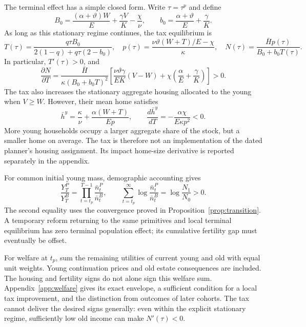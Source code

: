 \documentclass[11pt]{article}
\newcommand{\HH}{\bar H}
\newcommand{\tht}{\vartheta}
\begin{document}
The terminal effect has a simple closed form. Write $\tau=\tau^p$ and define
\[
 B_0=\frac{(\alpha+\tht)W}{E}+\frac{\gamma V}{K}-\frac\chi\nu,
 \qquad b_0=\frac{\alpha+\tht}{E}+\frac\gamma K.
\]
As long as this stationary regime continues, the tax equilibrium is
\begin{equation}
 T(\tau)=\frac{q\tau B_0}{2(1-q)+q\tau(2-b_0)},\quad
 p(\tau)=\frac{\nu\tht(W+T)/E-\chi}{\kappa},\quad
 N(\tau)=\frac{\HH p(\tau)}{B_0+b_0T(\tau)}.\label{eq:taxstationary}
\end{equation}
In particular, $T'(\tau)>0$, and
\begin{equation}
 \frac{\partial N}{\partial T}
 =\frac{\HH}{\kappa(B_0+b_0T)^2}
 \left[\frac{\nu\tht\gamma}{EK}(V-W)+\chi\left(\frac\alpha E+\frac\gamma K\right)\right]>0.\label{eq:Ntau}
\end{equation}
The tax also increases the stationary aggregate housing allocated to the young when $V\ge W$. However, their mean home satisfies
\begin{equation}
 \bar h^y=\frac\kappa\nu+\frac{\alpha(W+T)}{Ep},\qquad
 \frac{d\bar h^y}{dT}=-\frac{\alpha\chi}{E\kappa p^2}<0.\label{eq:peryoungfall}
\end{equation}
More young households occupy a larger aggregate share of the stock, but a smaller home on average. The tax is therefore not an implementation of the dated planner's housing assignment. Its impact home-size derivative is reported separately in the appendix.

For common initial young mass, demographic accounting gives
\begin{equation}
 \frac{Y_T^P}{Y_T^B}=\prod_{t=t_p}^{T-1}\frac{\bar n_t^P}{\bar n_t^B},\qquad
 \sum_{t=t_p}^{\infty}\log\frac{\bar n_t^P}{\bar n_t^B}
 =\log\frac{N_1}{N_0}>0.\label{eq:populationproduct}
\end{equation}
The second equality uses the convergence proved in Proposition~\ref{prop:transition}. A temporary reform returning to the same primitives and local terminal equilibrium has zero terminal population effect; its cumulative fertility gap must eventually be offset.

For welfare at $t_p$, sum the remaining utilities of current young and old with equal unit weights. Young continuation prices and old estate consequences are included. The housing and fertility signs do not alone sign this welfare sum. Appendix~\ref{app:welfare} gives its exact envelope, a sufficient condition for a local tax improvement, and the distinction from outcomes of later cohorts. The tax cannot deliver the desired signs generally: even within the explicit stationary regime, sufficiently low old income can make $N'(\tau)<0$.
\end{document}
